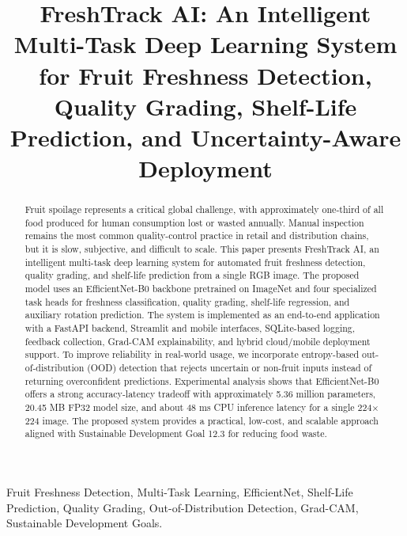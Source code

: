 \documentclass[conference]{IEEEtran}
\begin{document}
\title{FreshTrack AI: An Intelligent Multi-Task Deep Learning System for Fruit Freshness Detection, Quality Grading, Shelf-Life Prediction, and Uncertainty-Aware Deployment}

\author{
}

\maketitle

\begin{abstract}
Fruit spoilage represents a critical global challenge, with approximately one-third of all food produced for human consumption lost or wasted annually. Manual inspection remains the most common quality-control practice in retail and distribution chains, but it is slow, subjective, and difficult to scale. This paper presents FreshTrack AI, an intelligent multi-task deep learning system for automated fruit freshness detection, quality grading, and shelf-life prediction from a single RGB image. The proposed model uses an EfficientNet-B0 backbone pretrained on ImageNet and four specialized task heads for freshness classification, quality grading, shelf-life regression, and auxiliary rotation prediction. The system is implemented as an end-to-end application with a FastAPI backend, Streamlit and mobile interfaces, SQLite-based logging, feedback collection, Grad-CAM explainability, and hybrid cloud/mobile deployment support. To improve reliability in real-world usage, we incorporate entropy-based out-of-distribution (OOD) detection that rejects uncertain or non-fruit inputs instead of returning overconfident predictions. Experimental analysis shows that EfficientNet-B0 offers a strong accuracy-latency tradeoff with approximately 5.36 million parameters, 20.45 MB FP32 model size, and about 48 ms CPU inference latency for a single 224$\times$224 image. The proposed system provides a practical, low-cost, and scalable approach aligned with Sustainable Development Goal 12.3 for reducing food waste.
\end{abstract}

\begin{IEEEkeywords}
Fruit Freshness Detection, Multi-Task Learning, EfficientNet, Shelf-Life Prediction, Quality Grading, Out-of-Distribution Detection, Grad-CAM, Sustainable Development Goals.
\end{IEEEkeywords}
\end{document}
